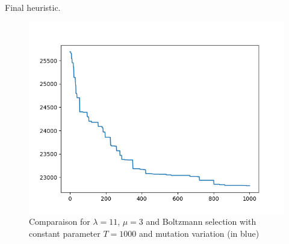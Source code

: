 \documentclass{beamer}
\begin{document}
\begin{frame}
	Final heuristic.
\begin{figure}
\centering
\includegraphics[scale=.5]{../Plots/new/11,3,mut,Boltzmann.png}
\caption{Comparaison for $\lambda = 11$, $\mu = 3$ and Boltzmann selection with
constant parameter $T = 1000$ and mutation variation (in blue)}
\label{MutationBoltzmann}
\end{figure}
\end{frame}
\end{document}
